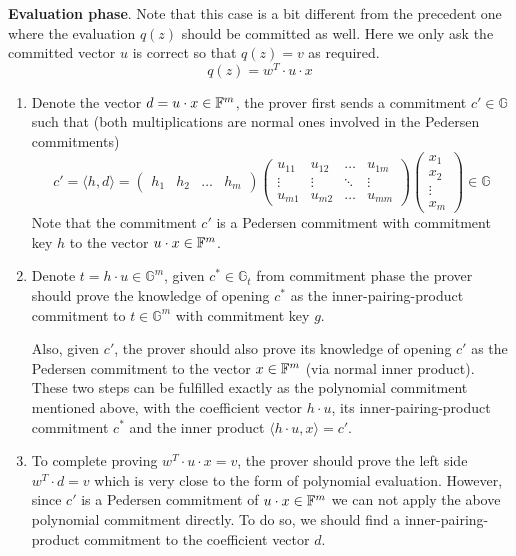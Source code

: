 \documentclass{article}
\begin{document}
\textbf{Evaluation phase}. Note that this case is a bit different from the precedent one where the evaluation $q(z)$ should be committed as well. Here we only ask the committed vector $u$ is correct so that $q(z) = v$ as required. 
\begin{equation*}
q(z) = w^T \cdot u \cdot x
\end{equation*}
\begin{enumerate}
\item\label{item:94} Denote the vector $d = u \cdot x \in \mathbb{F}^m$, the prover first sends a commitment $c' \in \mathbb{G}$ such that (both multiplications are normal ones involved in the Pedersen commitments)
\begin{equation*}
c' = \langle h, d \rangle = 
\begin{pmatrix}
h_1  &  h_2  & \dots &  h_m 
\end{pmatrix}
\begin{pmatrix}
u_{11}  & u_{12}   & \dots  & u_{1m} \\
\vdots & \vdots  & \ddots & \vdots \\
u_{m1}  & u_{m2}  &\dots     & u_{mm}
\end{pmatrix}
\begin{pmatrix}
x_1 \\
x_2 \\
\vdots \\
x_m
\end{pmatrix} \in \mathbb{G}
\end{equation*}
Note that the commitment $c'$ is a Pedersen commitment with commitment key $h$ to the vector $ u \cdot x \in \mathbb{F}^m$. 
\item\label{item:95} Denote $t = h \cdot u \in \mathbb{G}^m$, given $c^{\displaystyle *} \in \mathbb{G}_t$ from commitment phase the prover should prove the knowledge of opening $c^{\displaystyle *}$ as the inner-pairing-product commitment to $t \in \mathbb{G}^m$ with commitment key $g$. 

Also, given $c'$, the prover should also prove its knowledge of opening $c'$ as the Pedersen commitment to the vector $x \in \mathbb{F}^m$ (via normal inner product). These two steps can be fulfilled exactly as the polynomial commitment mentioned above, with the coefficient vector $h \cdot u$, its inner-pairing-product commitment $c^{\displaystyle *}$ and the inner product $\langle h \cdot u, x \rangle = c'$.  
\item\label{item:96} To complete proving $w^T \cdot u \cdot x = v$, the prover should prove the left side $w^T \cdot d = v$ which is very close to the form of polynomial evaluation. However, since $c'$ is a Pedersen commitment of $u \cdot x \in \mathbb{F}^m$ we can not apply the above polynomial commitment directly. To do so, we should find a inner-pairing-product commitment to the coefficient vector $d$. 


\end{enumerate}
\end{document}
